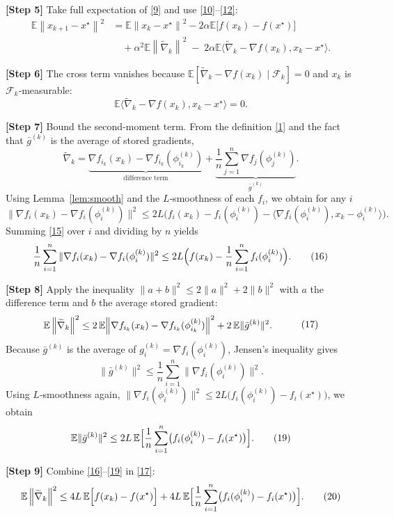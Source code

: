\documentclass{article}
\newcommand{\E}{\mathbb{E}}
\newcommand{\norm}[1]{\left\lVert #1\right\rVert}
\begin{document}
\noindent\textbf{[Step 5]} Take full expectation of \eqref{9} and use \eqref{10}–\eqref{12}:
\[
\begin{aligned}
\E\norm{x_{k+1}-x^\star}^{2}
&= \E\norm{x_k-x^\star}^{2}
-2\alpha\E\bigl[f(x_k)-f(x^\star)\bigr] \\
&\quad +\alpha^{2}\E\norm{\widetilde\nabla_k}^{2}
\;-\;2\alpha\E\bigl\langle \widetilde\nabla_k-\nabla f(x_k),x_k-x^\star\bigr\rangle .
\end{aligned}
\tag{13}
\]

\noindent\textbf{[Step 6]} The cross term vanishes because $\E[\widetilde\nabla_k-\nabla f(x_k)\mid\mathcal{F}_k]=0$ and $x_k$ is $\mathcal{F}_k$‑measurable:
\[
\E\bigl\langle \widetilde\nabla_k-\nabla f(x_k),x_k-x^\star\bigr\rangle =0.
\tag{14}
\]

\noindent\textbf{[Step 7]} Bound the second‑moment term. From the definition \eqref{1} and the fact that $\bar g^{(k)}$ is the average of stored gradients,
\[
\widetilde\nabla_k
= \underbrace{\nabla f_{i_k}(x_k)-\nabla f_{i_k}(\phi_{i_k}^{(k)})}_{\text{difference term}}
+ \underbrace{\frac1n\sum_{j=1}^{n}\nabla f_j(\phi_j^{(k)})}_{\bar g^{(k)}} .
\]
Using Lemma~\ref{lem:smooth} and the $L$‑smoothness of each $f_i$, we obtain for any $i$
\[
\|\nabla f_i(x_k)-\nabla f_i(\phi_i^{(k)})\|^{2}
\le 2L\bigl(f_i(x_k)-f_i(\phi_i^{(k)})-\langle\nabla f_i(\phi_i^{(k)}),x_k-\phi_i^{(k)}\rangle\bigr).
\tag{15}
\]
Summing \eqref{15} over $i$ and dividing by $n$ yields
\[
\frac1n\sum_{i=1}^{n}\|\nabla f_i(x_k)-\nabla f_i(\phi_i^{(k)})\|^{2}
\le 2L\Bigl(f(x_k)-\frac1n\sum_{i=1}^{n}f_i(\phi_i^{(k)})\Bigr).
\tag{16}
\]

\noindent\textbf{[Step 8]} Apply the inequality $\|a+b\|^{2}\le 2\|a\|^{2}+2\|b\|^{2}$ with $a$ the difference term and $b$ the average stored gradient:
\[
\begin{aligned}
\E\norm{\widetilde\nabla_k}^{2}
&\le 2\,\E\Bigl\|\nabla f_{i_k}(x_k)-\nabla f_{i_k}(\phi_{i_k}^{(k)})\Bigr\|^{2}
   +2\,\E\|\bar g^{(k)}\|^{2}.
\end{aligned}
\tag{17}
\]
Because $\bar g^{(k)}$ is the average of $g_i^{(k)}=\nabla f_i(\phi_i^{(k)})$, Jensen’s inequality gives
\[
\|\bar g^{(k)}\|^{2}\le \frac1n\sum_{i=1}^{n}\|\nabla f_i(\phi_i^{(k)})\|^{2}.
\tag{18}
\]
Using $L$‑smoothness again, $\|\nabla f_i(\phi_i^{(k)})\|^{2}\le 2L\bigl(f_i(\phi_i^{(k)})-f_i(x^\star)\bigr)$, we obtain
\[
\E\|\bar g^{(k)}\|^{2}\le 2L\,\E\Bigl[\frac1n\sum_{i=1}^{n}\bigl(f_i(\phi_i^{(k)})-f_i(x^\star)\bigr)\Bigr].
\tag{19}
\]

\noindent\textbf{[Step 9]} Combine \eqref{16}–\eqref{19} in \eqref{17}:
\[
\E\norm{\widetilde\nabla_k}^{2}
\le 4L\,\E\Bigl[f(x_k)-f(x^\star)\Bigr]
    +4L\,\E\Bigl[\frac1n\sum_{i=1}^{n}\bigl(f_i(\phi_i^{(k)})-f_i(x^\star)\bigr)\Bigr].
\tag{20}
\]
\end{document}
